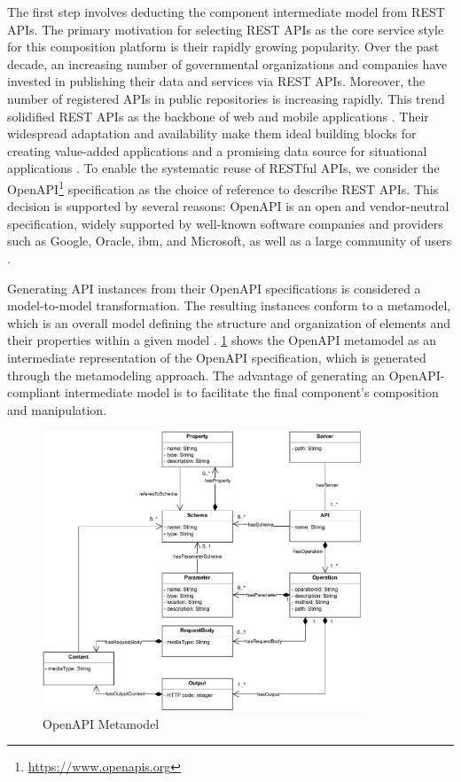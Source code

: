 The first step involves deducting the component intermediate model from
REST APIs. The primary motivation for selecting REST APIs as the core
service style for this composition platform is their rapidly growing
popularity. Over the past decade, an increasing number of governmental
organizations and companies have invested in publishing their data and
services via REST APIs. Moreover, the number of registered APIs in
public repositories is increasing rapidly. This trend solidified REST
APIs as the backbone of web and mobile applications \autocite{Ed-douibi2017}.
Their widespread adaptation and availability make them ideal
building blocks for creating value-added applications and a promising
data source for situational applications \autocite{Zarei2021}.
To enable the systematic reuse of RESTful APIs, we consider the
OpenAPI\footnote{\url{https://www.openapis.org}} specification as the
choice of reference to describe REST APIs. This decision is supported by
several reasons: OpenAPI is an open and vendor-neutral specification,
widely supported by well-known software companies and providers such as
Google, Oracle, \gls{ibm}, and Microsoft, as well as a large community of users
\autocite{Karavisileiou2021}.

Generating API instances from their OpenAPI specifications is considered
a model-to-model transformation. The resulting instances conform to a
metamodel, which is an overall model defining the structure and
organization of elements and their properties within a given model
\autocite{Czarnecki2003}. \cref{fig:openapi-metamodel} shows the
OpenAPI metamodel as an intermediate representation of the OpenAPI 
specification, which is generated through the metamodeling approach. The
advantage of generating an OpenAPI-compliant intermediate model is to
facilitate the final component’s composition and manipulation.

\begin{figure}[hbt]
\hypertarget{fig:openapi-metamodel}{%
\centering
\includegraphics[width=0.85\textwidth]{../figures/MyFigures/openapi-metamodel.drawio.pdf}
\captionsetup{justification=centering}
\caption{OpenAPI Metamodel}\label{fig:openapi-metamodel}
}
\end{figure}

